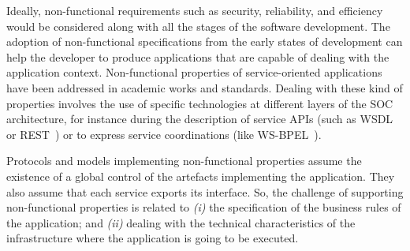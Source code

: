 \documentclass{llncs}
\theoremstyle{plain}
\theoremstyle{plain}
\theoremstyle{plain}
\begin{document}
Ideally, non-functional requirements such as
security, reliability, and efficiency
would be considered along with all the stages of the software development. The
adoption of non-functional specifications from the early states of development
can help the developer to produce applications that are capable of dealing with
the application context.
%
%
Non-functional properties of service-oriented applications  have been
addressed in academic works and standards. %
Dealing with these kind of properties involves the use of specific technologies
at different layers of the SOC architecture, for instance during the description
of service APIs (such as WSDL\cite{wsdl} or REST~\cite{rest}) or to express
service coordinations (like WS-BPEL~\cite{bpel03}).


Protocols and models implementing non-functional properties assume the existence of a global control of the artefacts implementing the application.
They also assume that each service exports its interface.
So, the challenge of supporting non-functional properties is related to
\textit{(i)} the specification of the business rules of the application; and 
\textit{(ii)} dealing with the technical characteristics of the infrastructure where the application is  going to be executed.
\end{document}
